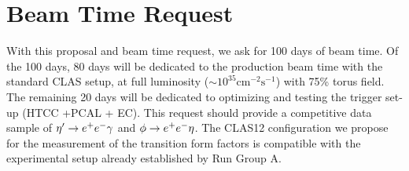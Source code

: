 \section{Beam Time Request}
With this proposal and beam time request, we ask for 100 days of beam time. Of the 100 days, 80 days will be dedicated to the production beam time with the standard CLAS setup, at full luminosity ($\sim 10^{35} \mathrm{cm^{-2}s^{-1}}$) with 75\% torus field. The remaining 20 days will be dedicated to optimizing and testing the trigger set-up (HTCC +PCAL + EC). This request should provide a competitive data sample of $\eta^{\prime} \to e^+e^- \gamma$ and $\phi \to e^+e^- \eta$. The CLAS12 configuration we propose for the measurement of the transition form factors is compatible with the experimental setup already established by Run Group A.